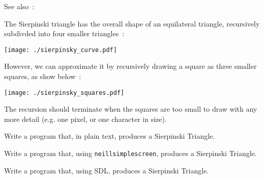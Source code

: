 
See also~:

The Sierpinski triangle has the overall shape of an equilateral 
triangle, recursively subdivded into four smaller triangles~:
\begin{center}
\centering\texttt{[image: ./sierpinsky\_curve.pdf]}
\end{center}

However, we can approximate it by recursively drawing a square
as three smaller squares, as show below~:
\begin{center}
\centering\texttt{[image: ./sierpinsky\_squares.pdf]}
\end{center}

The recursion should terminate when the squares are too small to draw with any more detail (e.g. one pixel, or one character in size).

\begin{exercise}
Write a program that, in plain text, produces a Sierpinski Triangle.
\end{exercise}

\begin{exercise}
Write a program that, using \verb^neillsimplescreen^,
produces a Sierpinski Triangle.
\end{exercise}

\begin{exercise}
Write a program that, using SDL, produces a Sierpinski Triangle.
\end{exercise}

